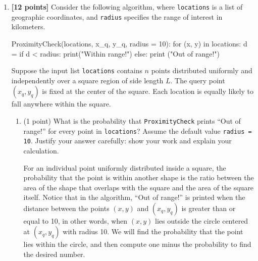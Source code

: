 \documentclass{assignment-263}
\begin{document}
\think
\begin{enumerate}
\item \textbf{[12 points]}
Consider the following algorithm, where \texttt{locations} is a list of geographic coordinates, and \texttt{radius} specifies the range of interest in kilometers.

\begin{python}
ProximityCheck(locations, x_q, y_q, radius = 10):
  for (x, y) in locations:
    d =  
    if d < radius:
      print("Within range!")
    else:
      print ("Out of range!")
\end{python}

Suppose the input list \texttt{locations} contains $n$ points distributed uniformly and independently over a square region of side length $L$. The query point $(x_q, y_q)$ is fixed at the center of the square. Each location is equally likely to fall anywhere within the square.

\begin{enumerate}
    \item (1 point) What is the probability that \texttt{ProximityCheck} prints ``Out of range!'' for every point in \texttt{locations}? Assume the default value \texttt{radius = 10}. Justify your answer carefully: show your work and explain your calculation.

    For an individual point uniformly distributed inside a square, the probability that the point is within another shape is the ratio between the area of the shape that overlaps with the square and the area of the square itself. Notice that in the algorithm, ``Out of range!'' is printed when the distance between the points \((x,y)\) and \((x_q, y_q)\) is greater than or equal to 10, in other words, when \((x,y)\) lies outside the circle centered at \((x_q,y_q)\) with radius 10. We will find the probability that the point lies within the circle, and then compute one minus the probability to find the desired number.
    
    




\end{enumerate}
\end{enumerate}
\end{document}

